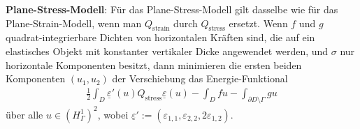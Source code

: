 \textbf{Plane-Stress-Modell}:
Für das Plane-Stress-Modell gilt dasselbe wie für das Plane-Strain-Modell,
wenn man $Q_{\text{strain}}$ durch $Q_{\text{stress}}$ ersetzt.
Wenn $f$ und $g$ quadrat-integrierbare Dichten von horizontalen Kräften sind,
die auf ein elastisches Objekt mit konstanter vertikaler Dicke angewendet werden,
und $\sigma$ nur horizontale Komponenten besitzt, dann
minimieren die ersten beiden Komponenten $(u_1, u_2)$ der Verschiebung das Energie-Funktional
\begin{align*}
    \frac{1}{2} \int_D \underline{\varepsilon}'(u) Q_{\text{stress}} \underline{\varepsilon}(u) -
    \int_D fu - \int_{\partial D \setminus \Gamma} gu
\end{align*}
über alle $u \in (H_\Gamma^1)^2$, wobei
$\underline{\varepsilon}' := (\varepsilon_{1,1}, \varepsilon_{2,2}, 2\varepsilon_{1,2})$.

\pagebreak

